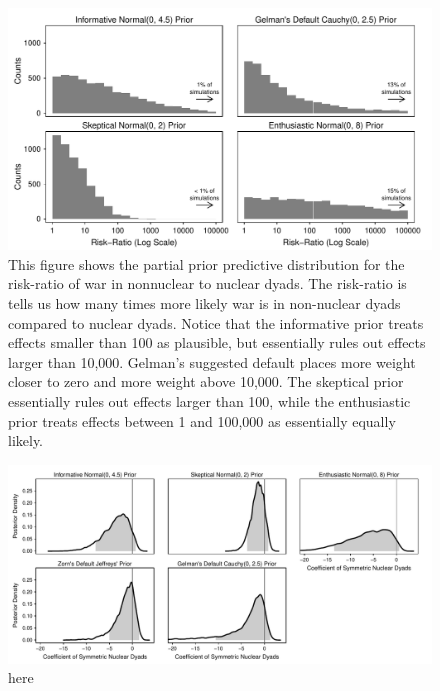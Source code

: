 \documentclass[12pt]{article}
\begin{document}
\begin{figure}[H]
\begin{center}
\includegraphics[scale = .8]{figs/bm-pppd-hist.pdf}
\caption{This figure shows the partial prior predictive distribution for the risk-ratio of war in nonnuclear to nuclear dyads. The risk-ratio is tells us how many times more likely war is in non-nuclear dyads compared to nuclear dyads. Notice that the informative prior treats effects smaller than 100 as plausible, but essentially rules out effects larger than 10,000. Gelman's suggested default places more weight closer to zero and more weight above 10,000. The skeptical prior essentially rules out effects larger than 100, while the enthusiastic prior treats effects between 1 and 100,000 as essentially equally likely.}\label{fig:bm-pppd-hist}
\end{center}
\end{figure}



\begin{figure}[H]
\begin{center}
\includegraphics[scale = .8]{figs/bm-posterior-density.pdf}
\caption{here}\label{fig:bm-posterior-density}
\end{center}
\end{figure}
\end{document}
